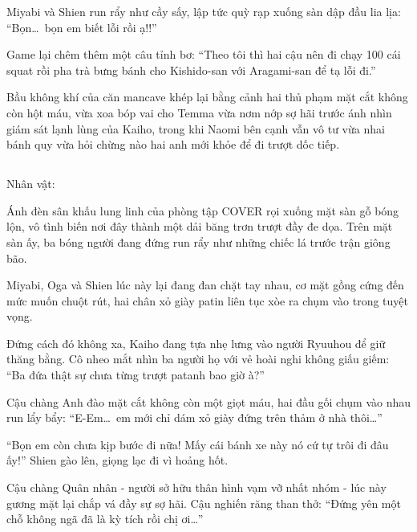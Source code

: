 \documentclass[../main.tex]{subfiles}
\begin{document}
Miyabi và Shien run rẩy như cầy sấy, lập tức quỳ rạp xuống sàn dập đầu lia lịa: ``Bọn\dots\ bọn em biết lỗi rồi ạ!!''

Game lại chêm thêm một câu tỉnh bơ: ``Theo tôi thì hai cậu nên đi chạy 100 cái squat rồi pha trà bưng bánh cho Kishido-san với Aragami-san để tạ lỗi đi.''

Bầu không khí của căn mancave khép lại bằng cảnh hai thủ phạm mặt cắt không còn hột máu, vừa xoa bóp vai cho Temma vừa nơm nớp sợ hãi trước ánh nhìn giám sát lạnh lùng của Kaiho, trong khi Naomi bên cạnh vẫn vô tư vừa nhai bánh quy vừa hỏi chừng nào hai anh mới khỏe để đi trượt dốc tiếp.

\newpage

\subsection*{\label{ep-SM1.II}}
\vspace{-4pt}
\begin{center}
  {\caviar\fontsize{12pt}{12pt}\selectfont Nhân vật:       }
\end{center}

Ánh đèn sân khấu lung linh của phòng tập COVER rọi xuống mặt sàn gỗ bóng lộn, vô tình biến nơi đây thành một dải băng trơn trượt đầy đe dọa. Trên mặt sàn ấy, ba bóng người đang đứng run rẩy như những chiếc lá trước trận giông bão.

Miyabi, Oga và Shien lúc này lại đang đan chặt tay nhau, cơ mặt gồng cứng đến mức muốn chuột rút, hai chân xỏ giày patin liên tục xòe ra chụm vào trong tuyệt vọng.


Đứng cách đó không xa, Kaiho đang tựa nhẹ lưng vào người Ryuuhou để giữ thăng bằng. Cô nheo mắt nhìn ba người họ với vẻ hoài nghi không giấu giếm: ``Ba đứa thật sự chưa từng trượt patanh bao giờ à?''

Cậu chàng Anh đào mặt cắt không còn một giọt máu, hai đầu gối chụm vào nhau run lẩy bẩy: ``E-Em\dots\ em mới chỉ dám xỏ giày đứng trên thảm ở nhà thôi\dots''

``Bọn em còn chưa kịp bước đi nữa! Mấy cái bánh xe này nó cứ tự trôi đi đâu ấy!'' Shien gào lên, giọng lạc đi vì hoảng hốt.

Cậu chàng Quân nhân - người sở hữu thân hình vạm vỡ nhất nhóm - lúc này gương mặt lại chắp vá đầy sự sợ hãi. Cậu nghiến răng than thở: ``Đứng yên một chỗ không ngã đã là kỳ tích rồi chị ơi\dots''
\end{document}
